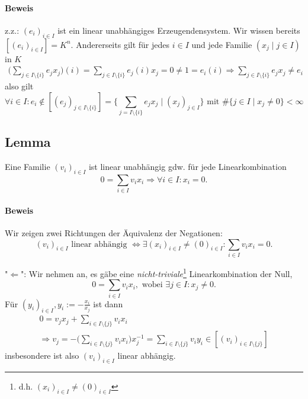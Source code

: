  	\paragraph{Beweis}
 		z.z.: $ (e_i)_{i\in I} $ ist ein linear unabhängiges Erzeugendensystem. Wir wissen bereits $ [(e_i)_{i\in I}] = K^n $. Andererseits gilt für jedes $i\in I$ und jede Familie $(x_j\mid j\in I)$ in $ K $
 		\begin{gather*}
 			\Big(\sum_{j\in I\setminus\{i\}}e_jx_j\Big)(i) = \sum_{j\in I\setminus\{i\}}e_j(i)x_j = 0 \neq 1 = e_i(i) \Rightarrow \sum_{j\in I\setminus\{i\}} e_jx_j \neq e_i
 		\end{gather*}
 		also gilt
 		\begin{equation*}
 			\forall i\in I: e_i \notin [(e_j)_{j\in I\setminus\{i\}}] = \Big\{\sum_{j=I\setminus\{i\}} e_jx_j\mid (x_j)_{ j\in I}\Big\} \text{ mit } \#\{j\in I\mid x_j \neq 0\}<\infty
 		\end{equation*}

 \subsection{Lemma}
 	\begin{Lemma}
 		Eine Familie $(v_i)_{i\in I}$ ist linear unabhängig gdw. für jede Linearkombination
 		\[
 			0 = \sum_{i\in I} v_ix_i \Rightarrow \forall i\in I: x_i = 0.
 		\]
 	\end{Lemma}

 	\paragraph{Beweis}
 		Wir zeigen zwei Richtungen der Äquivalenz der Negationen:
 		\[
 			(v_i)_{i\in I} \text{ linear abhängig } \Leftrightarrow \exists(x_i)_{i\in I} \neq (0)_{i\in I}: \sum_{i\in I} v_ix_i = 0.
 		\]

 		"$\Leftarrow$":
 		Wir nehmen an, es gäbe eine \emph{nicht-triviale}\footnote{d.h. $(x_i)_{i\in I}\neq (0)_{i\in I}$} Linearkombination der Null,
 		\[
 			0 = \sum_{i\in I} v_ix_i, \text{ wobei } \exists j\in I: x_j \neq 0.
 		\]
 		Für $(y_i)_{i\in I}, y_i := - \frac{x_i}{x_j}$ ist dann
 		\begin{gather*}
 			0 = v_jx_j + \sum_{i\in I\setminus\{j\}} v_ix_i \\
 			\Rightarrow v_j = -\Big(\sum_{i\in I\setminus\{j\}}v_ix_i\Big)x_j^{-1} = \sum_{i\in I\setminus\{j\}} v_iy_i \in [(v_i)_{i\in I\setminus\{j\}}]
 		\end{gather*}
 		insbesondere ist also $(v_i)_{i\in I}$ linear abhängig.

